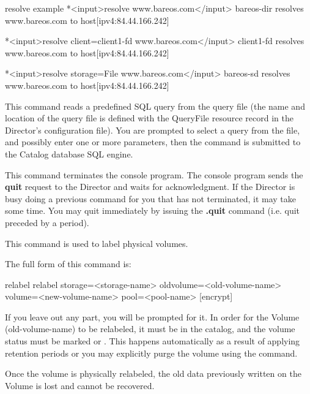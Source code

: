 \begin{description}
\begin{bconsole}{resolve example}
*<input>resolve www.bareos.com</input>
bareos-dir resolves www.bareos.com to host[ipv4:84.44.166.242]

*<input>resolve client=client1-fd www.bareos.com</input>
client1-fd resolves www.bareos.com to host[ipv4:84.44.166.242]

*<input>resolve storage=File www.bareos.com</input>
bareos-sd resolves www.bareos.com to host[ipv4:84.44.166.242]
\end{bconsole}


\item [query]
   \label{sec:bcommandQuery}
   This command reads a predefined SQL query from  the query file (the name and
   location of the  query file is defined with the QueryFile resource record in
   the Director's configuration file). You are prompted to select  a query from
   the file, and possibly enter one or more parameters,  then the command is
   submitted to the Catalog database SQL engine.

\item [quit]
   This command terminates the console program. The  console program sends the
   {\bf quit} request to the Director  and waits for acknowledgment. If the
   Director is busy doing  a previous command for you that has not terminated, it
   may  take some time. You may quit immediately by issuing the  {\bf .quit}
   command (i.e. quit preceded by a period).

\item [relabel]
   This command is used to label physical volumes.

   The full form of this command is:

\begin{bconsole}{relabel}
relabel storage=<storage-name> oldvolume=<old-volume-name> volume=<new-volume-name> pool=<pool-name> [encrypt]
\end{bconsole}

   If you leave out any part, you will be prompted for it.  In order for
   the Volume (old-volume-name) to be relabeled, it must be in the catalog,
   and the volume status must be marked  or .
   This happens automatically as a result of applying retention periods or
   you may explicitly purge the volume using the  command.

   Once the volume is physically relabeled, the old data previously written
   on the Volume is lost and cannot be recovered.


\end{description}
